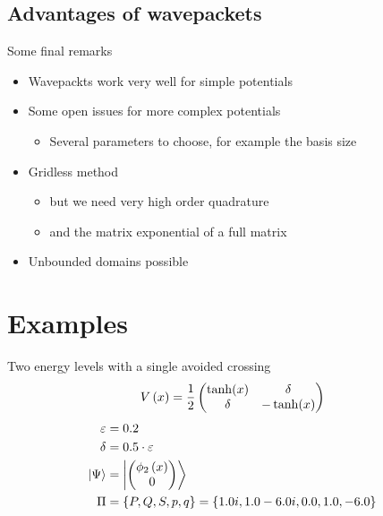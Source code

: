 \documentclass{beamer}
\begin{document}
\subsection{Advantages of wavepackets}


\begin{frame}{Some final remarks}
  \begin{itemize}
  \item Wavepackts work very well for simple potentials
  \item Some open issues for more complex potentials
    \begin{itemize}
    \item Several parameters to choose, for example the basis size
    \end{itemize}
  \item Gridless method
    \begin{itemize}
    \item but we need very high order quadrature
    \item and the matrix exponential of a full matrix
    \end{itemize}
  \item Unbounded domains possible
  \end{itemize}
\end{frame}


\section{Examples}


\begin{frame}{Two energy levels with a single avoided crossing}
  \begin{equation*}
    V\left( x \right) =   \frac{1}{2}
    \begin{pmatrix}
      \tanh(x) & \delta \\
      \delta   & -\tanh(x)
    \end{pmatrix}
  \end{equation*}
  \begin{align*}
    \varepsilon & = 0.2 \\
    \delta & = 0.5 \cdot \varepsilon \\
    \Ket{\Psi} & = \Ket{ \begin{pmatrix}
        \phi_2\left( x \right) \\
        0
      \end{pmatrix}} \\
    \Pi & = \{P, Q, S, p, q\} = \{1.0i, 1.0-6.0i, 0.0, 1.0, -6.0\}
  \end{align*}
\end{frame}
\end{document}
